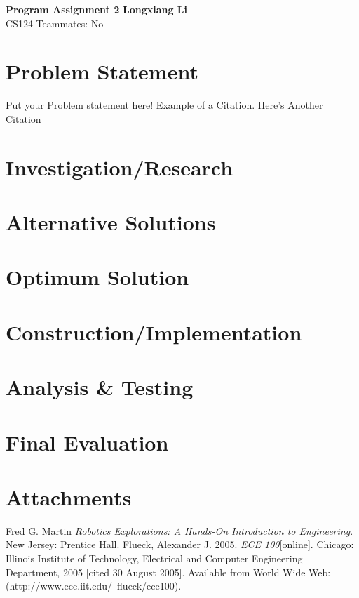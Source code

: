 \documentclass[a4paper, 11pt]{article}
\begin{document}
\noindent
\large\textbf{Program Assignment 2} \hfill \textbf{Longxiang Li} \\
\normalsize CS124 \hfill Teammates: No \\


\section*{Problem Statement}
Put your Problem statement here! Example of a Citation\cite[p.219]{Robotics}. Here's Another Citation\cite{Flueck}

\section*{Investigation/Research}

\section*{Alternative Solutions}

\section*{Optimum Solution}


\section*{Construction/Implementation}

\section*{Analysis \& Testing}

\section*{Final Evaluation}

\section*{Attachments}

\begin{thebibliography}{9}
 Fred G. Martin \emph{Robotics Explorations: A Hands-On Introduction to Engineering}. New Jersey: Prentice Hall.
  Flueck, Alexander J. 2005. \emph{ECE 100}[online]. Chicago: Illinois Institute of Technology, Electrical and Computer Engineering Department, 2005 [cited 30
August 2005]. Available from World Wide Web: (http://www.ece.iit.edu/~flueck/ece100).
\end{thebibliography}
\end{document}
